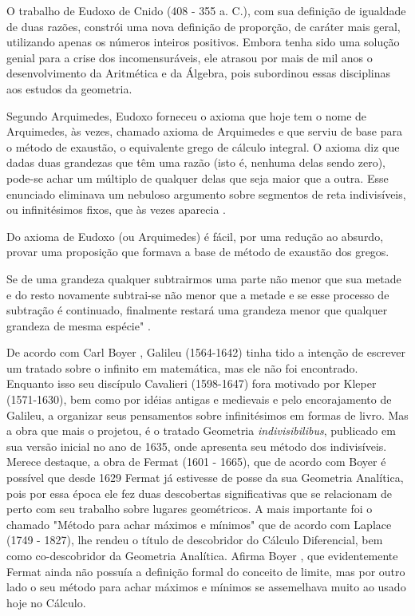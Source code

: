 O trabalho de Eudoxo de Cnido (408 - 355 a. C.), com sua definição
de igualdade de duas razões, constrói uma nova definição de
proporção, de caráter mais geral, utilizando apenas os números
inteiros positivos. Embora tenha sido uma solução genial para a
crise dos incomensuráveis, ele atrasou por mais de mil anos o
desenvolvimento da Aritmética e da Álgebra, pois subordinou essas
disciplinas aos estudos da geometria.\\


\begin{citacao}
Segundo Arquimedes, Eudoxo forneceu o axioma que hoje tem o nome de Arquimedes, às
vezes, chamado axioma de Arquimedes e que serviu de base para o
método de exaustão, o equivalente grego de cálculo integral. O
axioma diz que dadas duas grandezas que têm uma razão (isto é,
nenhuma delas sendo zero), pode-se achar um múltiplo de qualquer
delas que seja maior que a outra. Esse enunciado eliminava um
nebuloso argumento sobre segmentos de reta indivisíveis, ou
infinitésimos fixos, que às vezes aparecia \cite[p.62]{boyer}.
\end{citacao}


\medskip
 Do axioma de Eudoxo (ou Arquimedes) é fácil, por uma redução ao absurdo, provar uma
proposição que formava a base de método de exaustão dos gregos. 
\begin{citacao}
Se de uma grandeza qualquer subtrairmos uma parte não menor que sua
metade e do resto novamente subtrai-se não menor que a metade e se
esse processo de subtração é continuado, finalmente restará uma
grandeza menor que qualquer grandeza de mesma espécie" \cite[p.63]{boyer}. 
\end{citacao}


 De acordo com Carl Boyer \cite[p.226]{boyer}, Galileu (1564-1642)
tinha tido a intenção de escrever um tratado sobre o infinito em
matemática, mas ele não foi encontrado. Enquanto isso seu discípulo
Cavalieri (1598-1647) fora motivado por Kleper (1571-1630), bem como
por idéias antigas e medievais e pelo encorajamento de Galileu, a
organizar seus pensamentos sobre infinitésimos em formas de livro.
Mas a obra que mais o projetou, é o tratado Geometria
\textit{indivisibilibus}, publicado em sua versão inicial no ano de 1635,
onde apresenta seu método dos indivisíveis.\\


 Merece destaque, a obra de Fermat (1601 - 1665), que de acordo com
Boyer \cite[p.239]{boyer} é possível que desde 1629 Fermat já estivesse de posse
da sua Geometria Analítica, pois por essa época ele fez duas
descobertas significativas que se relacionam de perto com seu
trabalho sobre lugares geométricos. A mais importante foi o chamado
"Método para achar máximos e mínimos"   que de acordo com Laplace
(1749 - 1827), lhe rendeu o título de descobridor do Cálculo
Diferencial, bem como co-descobridor da Geometria Analítica.  Afirma
Boyer \cite[p.240]{boyer}, que evidentemente Fermat ainda não possuía a definição
formal do conceito de limite, mas por outro lado o seu método para
achar máximos e mínimos se assemelhava muito ao usado hoje no
Cálculo.\\

